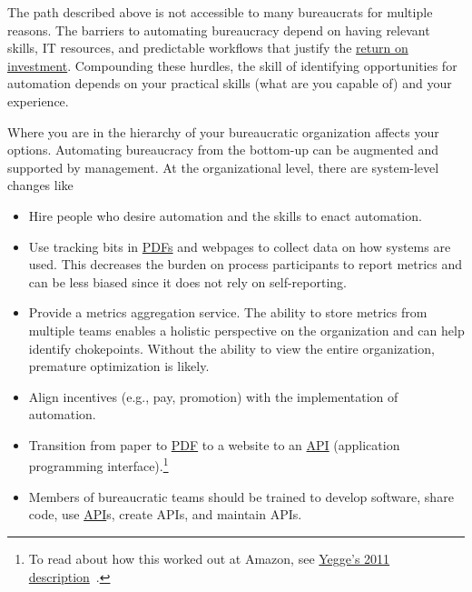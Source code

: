 The path described above is not accessible to many bureaucrats for multiple reasons. 
The barriers to automating bureaucracy depend on having relevant skills, IT resources, and predictable workflows that justify the
\href{https://en.wikipedia.org/wiki/Return_on_investment}{return on investment}. Compounding these hurdles, the skill of identifying opportunities for automation depends on your practical skills (what are you capable of) and your experience.

Where you are in the hierarchy of your bureaucratic organization affects your options. 
Automating bureaucracy from the bottom-up can be augmented and supported by management. 
At the organizational level, there are system-level changes like
\begin{itemize}
    \item Hire people who desire automation and the skills to enact automation.
    \item Use tracking bits in
    \href{https://en.wikipedia.org/wiki/PDF}{PDFs} and webpages to collect data on how systems are used. This decreases the burden on process participants to report metrics and can be less biased since it does not rely on self-reporting.
    \item Provide a metrics aggregation service. The ability to store metrics from multiple teams enables a holistic perspective on the organization and can help identify chokepoints. Without the ability to view the entire organization, premature optimization is likely.
    \item Align incentives (e.g., pay, promotion) with the implementation of automation.
    \item Transition from paper to 
    \href{https://en.wikipedia.org/wiki/PDF}{PDF} 
    to a website to an%
    \href{https://en.wikipedia.org/wiki/API}{API} (application programming interface).\footnote{To read about how this worked out at Amazon, see \href{https://gist.github.com/bhpayne/49c8379a3ea880b7cc079fc8d32c87a7}{Yegge's 2011 description}~\cite{2011_Yegge}.}
    \item Members of bureaucratic teams should be trained to develop software, share code, use \href{https://en.wikipedia.org/wiki/API}{API}s, 
    create APIs, and maintain APIs.
\end{itemize}

